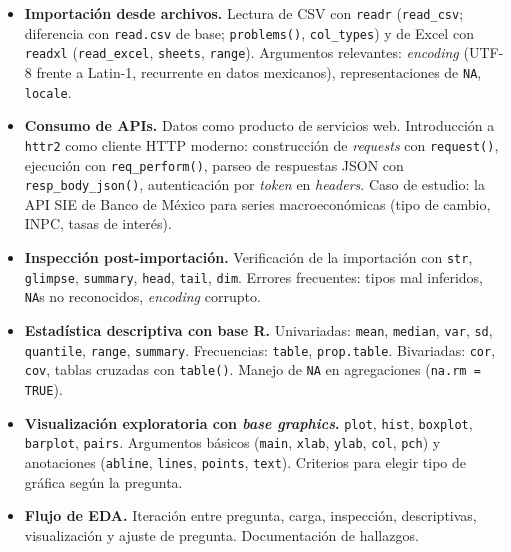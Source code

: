 \documentclass[11pt,letterpaper]{article}
\begin{document}
\begin{itemize}[leftmargin=*, itemsep=2pt]
    \item \textbf{Importación desde archivos.} Lectura de CSV con \texttt{readr} (\texttt{read\_csv}; diferencia con \texttt{read.csv} de base; \texttt{problems()}, \texttt{col\_types}) y de Excel con \texttt{readxl} (\texttt{read\_excel}, \texttt{sheets}, \texttt{range}). Argumentos relevantes: \textit{encoding} (UTF-8 frente a Latin-1, recurrente en datos mexicanos), representaciones de \texttt{NA}, \texttt{locale}.
    \item \textbf{Consumo de APIs.} Datos como producto de servicios web. Introducción a \texttt{httr2} como cliente HTTP moderno: construcción de \textit{requests} con \texttt{request()}, ejecución con \texttt{req\_perform()}, parseo de respuestas JSON con \texttt{resp\_body\_json()}, autenticación por \textit{token} en \textit{headers}. Caso de estudio: la API SIE de Banco de México para series macroeconómicas (tipo de cambio, INPC, tasas de interés).
    \item \textbf{Inspección post-importación.} Verificación de la importación con \texttt{str}, \texttt{glimpse}, \texttt{summary}, \texttt{head}, \texttt{tail}, \texttt{dim}. Errores frecuentes: tipos mal inferidos, \texttt{NA}s no reconocidos, \textit{encoding} corrupto.
    \item \textbf{Estadística descriptiva con base R.} Univariadas: \texttt{mean}, \texttt{median}, \texttt{var}, \texttt{sd}, \texttt{quantile}, \texttt{range}, \texttt{summary}. Frecuencias: \texttt{table}, \texttt{prop.table}. Bivariadas: \texttt{cor}, \texttt{cov}, tablas cruzadas con \texttt{table()}. Manejo de \texttt{NA} en agregaciones (\texttt{na.rm = TRUE}).
    \item \textbf{Visualización exploratoria con \textit{base graphics}.} \texttt{plot}, \texttt{hist}, \texttt{boxplot}, \texttt{barplot}, \texttt{pairs}. Argumentos básicos (\texttt{main}, \texttt{xlab}, \texttt{ylab}, \texttt{col}, \texttt{pch}) y anotaciones (\texttt{abline}, \texttt{lines}, \texttt{points}, \texttt{text}). Criterios para elegir tipo de gráfica según la pregunta.
    \item \textbf{Flujo de EDA.} Iteración entre pregunta, carga, inspección, descriptivas, visualización y ajuste de pregunta. Documentación de hallazgos.
\end{itemize}
\end{document}

